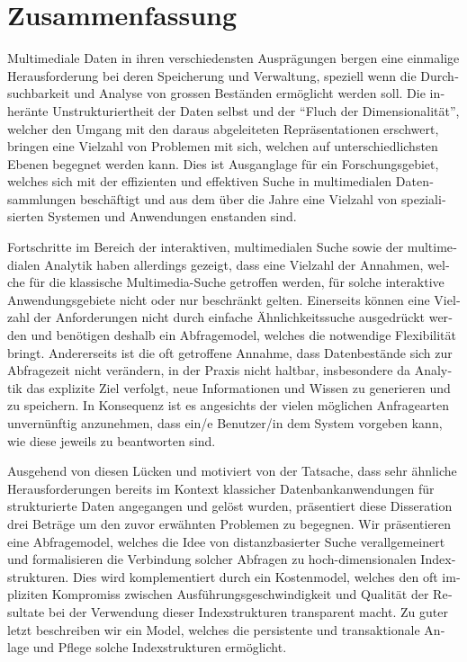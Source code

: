 
\chapter{Zusammenfassung}

\begin{otherlanguage}{ngerman}
Multimediale Daten in ihren verschiedensten Ausprägungen bergen eine einmalige Herausforderung bei deren Speicherung und Verwaltung, speziell wenn die Durchsuchbarkeit und Analyse von grossen Beständen ermöglicht werden soll. Die inheränte Unstrukturiertheit der Daten selbst und der ``Fluch der Dimensionalität'', welcher den Umgang mit den daraus abgeleiteten Repräsentationen erschwert, bringen eine Vielzahl von Problemen mit sich, welchen auf unterschiedlichsten Ebenen begegnet werden kann. Dies ist Ausganglage für ein Forschungsgebiet, welches sich mit der effizienten und effektiven Suche in multimedialen Datensammlungen beschäftigt und aus dem über die Jahre eine Vielzahl von spezialisierten Systemen und Anwendungen enstanden sind.

Fortschritte im Bereich der interaktiven, multimedialen Suche sowie der multimedialen Analytik haben allerdings gezeigt, dass eine Vielzahl der Annahmen, welche für die klassische Multimedia-Suche getroffen werden, für solche interaktive Anwendungsgebiete nicht oder nur beschränkt gelten. Einerseits können eine Vielzahl der Anforderungen nicht durch einfache Ähnlichkeitssuche ausgedrückt werden und benötigen deshalb ein Abfragemodel, welches die notwendige Flexibilität bringt. Andererseits ist die oft getroffene Annahme, dass Datenbestände sich zur Abfragezeit nicht verändern, in der Praxis nicht haltbar, insbesondere da Analytik das explizite Ziel verfolgt, neue Informationen und Wissen zu generieren und zu speichern. In Konsequenz ist es angesichts der vielen möglichen Anfragearten unvernünftig anzunehmen, dass ein/e Benutzer/in dem System vorgeben kann, wie diese jeweils zu beantworten sind.
 
Ausgehend von diesen Lücken und motiviert von der Tatsache, dass sehr ähnliche Herausforderungen bereits im Kontext klassicher Datenbankanwendungen für strukturierte Daten angegangen und gelöst wurden, präsentiert diese Disseration drei Beträge um den zuvor erwähnten Problemen zu begegnen. Wir präsentieren eine Abfragemodel, welches die Idee von distanzbasierter Suche verallgemeinert und formalisieren die Verbindung solcher Abfragen zu hoch-dimensionalen Indexstrukturen. Dies wird komplementiert durch ein Kostenmodel, welches den oft impliziten Kompromiss zwischen Ausführungsgeschwindigkeit und Qualität  der Resultate bei der Verwendung dieser Indexstrukturen transparent macht. Zu guter letzt beschreiben wir ein Model, welches die persistente und transaktionale Anlage und Pflege solche Indexstrukturen ermöglicht.


\end{otherlanguage}
